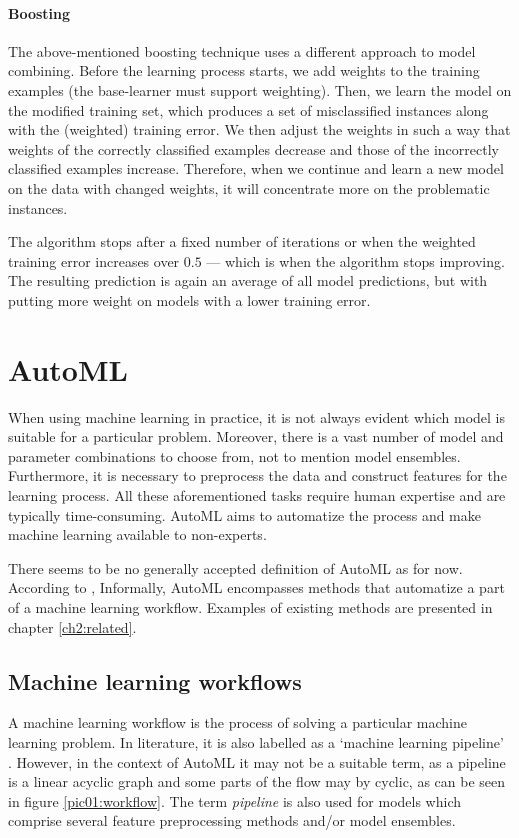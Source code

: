 \paragraph{Boosting} \label{boosting}
The above-mentioned boosting technique uses a different approach to model
combining. Before the learning process starts, we add weights to the training 
examples (the base-learner must support weighting). Then, we learn the model
on the modified training set, which produces a set of misclassified instances
along with the (weighted) training error. We then adjust the weights in such a
way that weights of the correctly classified examples decrease and those of
the incorrectly classified examples increase. Therefore, when we continue and
learn a new model on the data with changed weights, it will concentrate more 
on the problematic instances.

The algorithm stops after a fixed number of iterations or when the weighted
training error increases over $0.5$ --- which is when the algorithm stops
improving. The resulting prediction is again an average of all model
predictions, but with putting more weight on models with a lower training
error. \citep[335]{Flach:2012:MLA:2490546}

\section{AutoML}
When using machine learning in practice, it is not always evident which model
is suitable for a particular problem. Moreover, there is a vast number of model
and parameter combinations to choose from, not to mention model ensembles.
Furthermore, it is necessary to preprocess the data and construct features
for the learning process. All these aforementioned tasks require human 
expertise and are typically time-consuming. AutoML aims to automatize the
process and make machine learning available to non-experts.

There seems to be no generally accepted definition of AutoML as for now.
According to \cite{DBLP:journals/corr/abs-1810-13306},
Informally, AutoML encompasses methods that automatize a part of a machine
learning workflow. Examples of existing methods are presented in chapter
\ref{ch2:related}.

\subsection{Machine learning workflows}
A machine learning workflow is the process of solving a particular machine
learning problem. In literature, it is also labelled as a `machine learning
pipeline' \cite{DBLP:journals/corr/abs-1810-13306}. However, in the context
of AutoML it may not be a suitable term, as a pipeline is a linear acyclic
graph and some parts of the flow may by cyclic, as can be seen
in figure \ref{pic01:workflow}. The term \emph{pipeline} is also used for
models which comprise several feature preprocessing methods and/or model
ensembles. %

